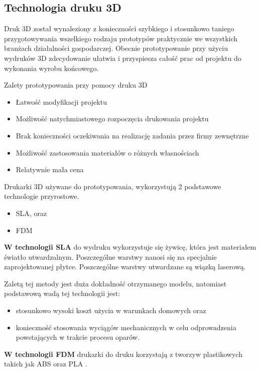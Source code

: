 \documentclass[a4paper,12pt,reqno]{article}
\begin{document}
\subsection{Technologia druku 3D}
Druk 3D został wynaleziony z konieczności szybkiego i stosunkowo taniego przygotowywania wszelkiego rodzaju prototypów praktycznie we wszystkich branżach działalności gospodarczej. 
Obecnie prototypowanie przy użyciu wydruków 3D zdecydowanie ułatwia i przyspiesza całość prac od projektu do wykonania wyrobu końcowego.

Zalety prototypowania przy pomocy druku 3D \cite{prototyp3dzalety}
\begin{itemize}
\item Łatwość modyfikacji projektu 
\item Możliwość natychmiastowego rozpoczęcia drukowania projektu
\item Brak konieczności oczekiwania na realizację zadania przez firmy zewnętrzne
\item Możliwość zastosowania materiałów o różnych własnościach
\item Relatywnie mała cena
\end{itemize}

Drukarki 3D używane do prototypowania, wykorzystują 2 podstawowe technologie przyrostowe.
\cite{prototyp3dzalety}
\begin{itemize}
\item SLA, oraz
\item FDM
\end{itemize}
\textbf{W technologii SLA} do wydruku wykorzystuje się żywicę, która jest materiałem światło utwardzalnym. Poszczególne warstwy nanosi się na specjalnie zaprojektowanej płytce. Poszczególne warstwy utwardzane są wiązką laserową. \cite{jakie_materialy_w_druku}

Zaletą tej metody jest duża dokładność otrzymanego modelu, natomiast podstawową wadą tej technologii jest:
\begin{itemize}
\item stosunkowo wysoki koszt użycia w warunkach domowych oraz
\item konieczność stosowania wyciągów mechanicznych w celu odprowadzenia powstających w trakcie procesu oparów.
\end{itemize}

\textbf{W technologii FDM} drukarki do druku korzystają z tworzyw plastikowych takich jak ABS oraz PLA \cite{jak_wybrac_tworzywo_do_drukarek} \cite{jakie_materialy_w_druku}.
\end{document}
